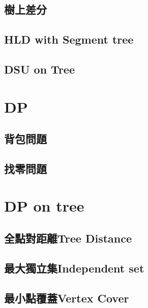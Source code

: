 \subsection{樹上差分}


\subsection{HLD with Segment tree}


\subsection{DSU on Tree}


\section{DP}

\subsection{背包問題}


\subsection{找零問題}


\section{DP on tree}

\subsection{全點對距離Tree Distance}


\subsection{最大獨立集Independent set}


\subsection{最小點覆蓋Vertex Cover}



